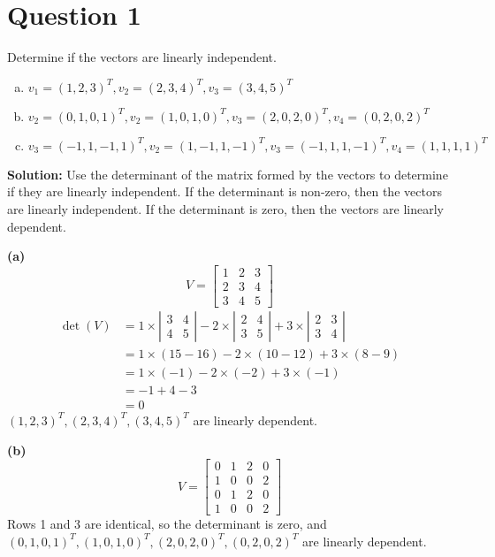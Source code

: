 \documentclass{article}
\begin{document}
\section*{Question 1}
Determine if the vectors are linearly independent.
\begin{enumerate}[(a)]
    \item $v_1 = (1, 2, 3)^T, v_2 = (2, 3, 4)^T, v_3 = (3, 4, 5)^T$
    \item $v_2 = (0, 1, 0, 1)^T, v_2 = (1, 0, 1, 0)^T, v_3 = (2, 0 , 2, 0)^T, v_4 = (0, 2, 0, 2)^T$
    \item $v_3 = (-1, 1, -1, 1)^T, v_2 = (1, -1, 1, -1)^T, v_3 = (-1, 1, 1, -1)^T, v_4 = (1, 1, 1, 1)^T$
\end{enumerate}

\noindent\textbf{Solution:}
Use the determinant of the matrix formed by the vectors to determine if they are linearly independent. 
If the determinant is non-zero, then the vectors are linearly independent. If the determinant is zero, then the vectors are linearly dependent.

\noindent\textbf{(a)}
$$ V = \begin{bmatrix} 1 & 2 & 3 \\ 2 & 3 & 4 \\ 3 & 4 & 5 \end{bmatrix} $$
\begin{align*}
    \det(V) &= 1 \times \left| \begin{matrix} 3 & 4 \\ 4 & 5 \end{matrix} \right| - 2 \times \left| \begin{matrix} 2 & 4 \\ 3 & 5 \end{matrix} \right| + 3 \times \left| \begin{matrix} 2 & 3 \\ 3 & 4 \end{matrix} \right| \\
    &= 1 \times (15 - 16) - 2 \times (10 - 12) + 3 \times (8 - 9) \\
    &= 1 \times (-1) - 2 \times (-2) + 3 \times (-1) \\
    &= -1 + 4 - 3 \\
    &= 0
\end{align*}
$ (1, 2, 3)^T, (2, 3, 4)^T, (3, 4, 5)^T $ are linearly dependent.

\vspace{0.25cm}
\noindent\textbf{(b)}
$$ V = \begin{bmatrix} 0 & 1 & 2 & 0 \\ 1 & 0 & 0 & 2 \\ 0 & 1 & 2 & 0 \\ 1 & 0 & 0 & 2 \end{bmatrix} $$
Rows 1 and 3 are identical, so the determinant is zero, and 
\newline $ (0, 1, 0, 1)^T, (1, 0, 1, 0)^T, (2, 0 , 2, 0)^T, (0, 2, 0, 2)^T $ are linearly dependent.
\end{document}
